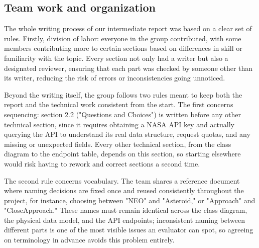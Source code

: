 \subsection{Team work and organization}
The whole writing process of our intermediate report was based on a clear set of rules. Firstly, division of labor: everyone in the group contributed, with some members contributing more to certain sections based on differences in skill or familiarity with the topic. Every section not only had a writer but also a designated reviewer, ensuring that each part was checked by someone other than its writer, reducing the risk of errors or inconsistencies going unnoticed.

\vspace{0.25cm}

Beyond the writing itself, the group follows two rules meant to keep both the report and the technical work consistent from the start. The first concerns sequencing: section 2.2 ("Questions and Choices") is written before any other technical section, since it requires obtaining a NASA API key and actually querying the API to understand its real data structure, request quotas, and any missing or unexpected fields. Every other technical section, from the class diagram to the endpoint table, depends on this section, so starting elsewhere would risk having to rework and correct sections a second time.

\vspace{0.25cm}

The second rule concerns vocabulary. The team shares a reference document where naming decisions are fixed once and reused consistently throughout the project, for instance, choosing between "NEO" and "Asteroid," or "Approach" and "CloseApproach." These names must remain identical across the class diagram, the physical data model, and the API endpoints; inconsistent naming between different parts is one of the most visible issues an evaluator can spot, so agreeing on terminology in advance avoids this problem entirely.

